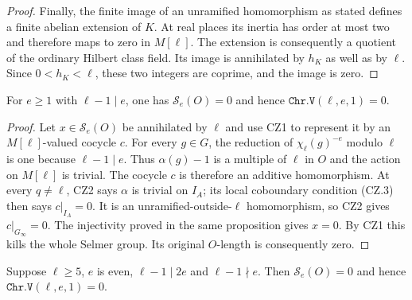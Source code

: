 \begin{proof}
Finally, the finite image of an unramified homomorphism as stated
defines a finite abelian extension of $K$.  At real places its
inertia has order at most two and therefore maps to zero in
$M[\ell]$.  The extension is consequently a quotient of the
ordinary Hilbert class field.  Its image is annihilated by $h_K$
as well as by $\ell$.  Since $0<h_K<\ell$, these two integers
are coprime, and the image is zero.
\end{proof}

\begin{proposition}
\label{prop:cz-trivial-vanishing}
For $e\ge1$ with $\ell-1\mid e$, one has
$\mathcal S_e(O)=0$ and hence
$\texttt{Chr.V}(\ell,e,1)=0$.
\end{proposition}

\begin{proof}
Let $x\in\mathcal S_e(O)$ be annihilated by $\ell$ and use
CZ1 to represent it by an $M[\ell]$-valued cocycle $c$.
For every $g\in G$, the reduction of $\chi_\ell(g)^{-e}$
modulo $\ell$ is one because $\ell-1\mid e$.
Thus $\alpha(g)-1$ is a multiple of $\ell$ in $O$ and the
action on $M[\ell]$ is trivial.  The cocycle $c$ is therefore
an additive homomorphism.
At every $q\ne\ell$, CZ2 says $\alpha$ is trivial on
$I_A$; its local coboundary condition (CZ.3) then says
$c|_{I_A}=0$.  It is an unramified-outside-$\ell$ homomorphism,
so CZ2 gives $c|_{G_\infty}=0$.  The injectivity proved in
the same proposition gives $x=0$.  By CZ1 this kills the whole
Selmer group.  Its original $O$-length is consequently zero.
\end{proof}

\begin{proposition}
\label{prop:cz-quadratic-vanishing}
Suppose $\ell\ge5$, $e$ is even,
$\ell-1\mid2e$ and $\ell-1\nmid e$.  Then
$\mathcal S_e(O)=0$ and hence
$\texttt{Chr.V}(\ell,e,1)=0$.
\end{proposition}


